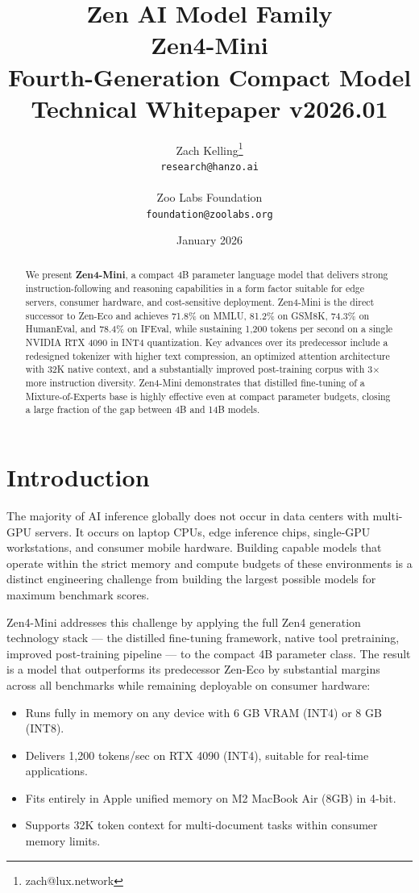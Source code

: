 \documentclass[11pt,a4paper]{article}
\title{
    \vspace{-2cm}
    \Large \textbf{Zen AI Model Family} \\
    \vspace{0.5cm}
    \Huge \textbf{Zen4-Mini} \\
    \vspace{0.3cm}
    \large Fourth-Generation Compact Model \\
    \vspace{0.5cm}
    \normalsize Technical Whitepaper v2026.01
}
\author{
    Zach Kelling\thanks{zach@lux.network} \\
    \texttt{research@hanzo.ai} \\
    \\
    Zoo Labs Foundation \\
    \texttt{foundation@zoolabs.org}
}
\date{January 2026}
\begin{document}
\maketitle

\begin{abstract}
We present \textbf{Zen4-Mini}, a compact 4B parameter language model that delivers strong
instruction-following and reasoning capabilities in a form factor suitable for edge servers,
consumer hardware, and cost-sensitive deployment. Zen4-Mini is the direct successor to
Zen-Eco and achieves 71.8\% on MMLU, 81.2\% on GSM8K, 74.3\% on HumanEval, and 78.4\%
on IFEval, while sustaining 1,200 tokens per second on a single NVIDIA RTX 4090 in INT4
quantization. Key advances over its predecessor include a redesigned tokenizer with
higher text compression, an optimized attention architecture with 32K native context, and
a substantially improved post-training corpus with 3$\times$ more instruction diversity.
Zen4-Mini demonstrates that distilled fine-tuning of a Mixture-of-Experts base is highly effective even at compact
parameter budgets, closing a large fraction of the gap between 4B and 14B models.
\end{abstract}

\tableofcontents
\newpage

\section{Introduction}

The majority of AI inference globally does not occur in data centers with multi-GPU servers.
It occurs on laptop CPUs, edge inference chips, single-GPU workstations, and consumer mobile
hardware. Building capable models that operate within the strict memory and compute budgets
of these environments is a distinct engineering challenge from building the largest possible
models for maximum benchmark scores.

Zen4-Mini addresses this challenge by applying the full Zen4 generation technology stack ---
the distilled fine-tuning framework, native tool pretraining, improved post-training
pipeline --- to the compact 4B parameter class. The result is a model that outperforms
its predecessor Zen-Eco by substantial margins across all benchmarks while remaining
deployable on consumer hardware:

\begin{itemize}
    \item Runs fully in memory on any device with 6 GB VRAM (INT4) or 8 GB (INT8).
    \item Delivers 1,200 tokens/sec on RTX 4090 (INT4), suitable for real-time applications.
    \item Fits entirely in Apple unified memory on M2 MacBook Air (8GB) in 4-bit.
    \item Supports 32K token context for multi-document tasks within consumer memory limits.
\end{itemize}
\end{document}
